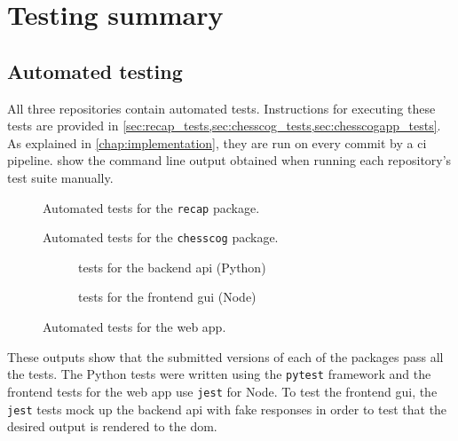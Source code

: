 \documentclass[../../report.tex]{subfiles}
\begin{document}
\chapter{Testing summary}

\section{Automated testing}
All three repositories contain automated tests.
Instructions for executing these tests are provided in \cref{sec:recap_tests,sec:chesscog_tests,sec:chesscogapp_tests}.
As explained in \cref{chap:implementation}, they are run on every commit by a \gls{ci} pipeline.
 show the command line output obtained when running each repository's test suite manually.
\begin{figure}
    
    \caption{Automated tests for the \texttt{recap} package.}
    \label{fig:tests_recap}
\end{figure}%
\begin{figure}
    
    \caption{Automated tests for the \texttt{chesscog} package.}
    \label{fig:tests_chesscog}
\end{figure}%
\begin{figure}
    \begin{subfigure}[b]{\textwidth}
        
        \caption{tests for the backend \acs{api} (Python)}
    \end{subfigure}
    \bigskip\par
    \begin{subfigure}[b]{\textwidth}
        
        \caption{tests for the frontend \acs{gui} (Node)}
    \end{subfigure}
    \caption{Automated tests for the web app.}
    \label{fig:tests_chesscogapp}
\end{figure}%
These outputs show that the submitted versions of each of the packages pass all the tests.
The Python tests were written using the \texttt{pytest} framework and the frontend tests for the web app use \texttt{jest} for Node.
To test the frontend \gls{gui}, the \texttt{jest} tests mock up the backend \gls{api} with fake responses in order to test that the desired output is rendered to the \gls{dom}.
\end{document}
